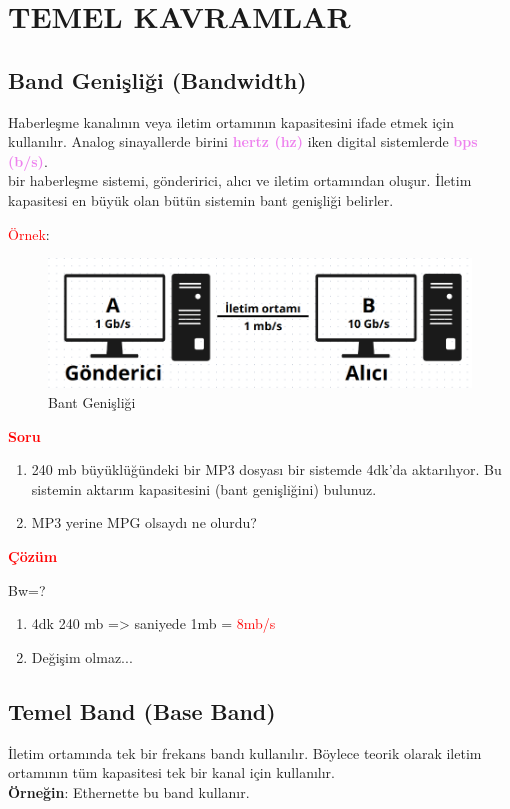 \section{TEMEL KAVRAMLAR}

\subsection{Band Genişliği (Bandwidth)}
\tab Haberleşme kanalının veya iletim ortamının kapasitesini ifade etmek için kullanılır.
Analog sinayallerde birini \textbf{\textcolor{violet}{hertz (hz)}} iken digital sistemlerde \textbf{\textcolor{violet}{bps (b/s)}}.\\
bir haberleşme sistemi, gönderirici, alıcı ve iletim ortamından oluşur.
İletim kapasitesi en büyük olan bütün sistemin bant genişliği belirler.

\textcolor{red}{Örnek}:
\begin{figure}[ht]
    \centering
    \includegraphics[width=17cm]{images/bandwidth}
    \caption{Bant Genişliği}
    \label{fig:bandwidth_example}
\end{figure}

\textbf{\textcolor{red}{Soru}}
\begin{enumerate}
    \item 240 mb büyüklüğündeki bir MP3 dosyası bir sistemde 4dk'da aktarılıyor.
    Bu sistemin aktarım kapasitesini (bant genişliğini) bulunuz.
    \item MP3 yerine MPG olsaydı ne olurdu?
\end{enumerate}

\textbf{\textcolor{red}{Çözüm}}

Bw=?
\begin{enumerate}
    \item 4dk 240 mb => saniyede 1mb = \textcolor{red}{8mb/s}
    \item Değişim olmaz...
\end{enumerate}

\subsection{Temel Band (Base Band)}
\tab İletim ortamında tek bir frekans bandı kullanılır.
Böylece teorik olarak iletim ortamının tüm kapasitesi tek bir kanal için kullanılır.\\
\textbf{Örneğin}: Ethernette bu band kullanır.

